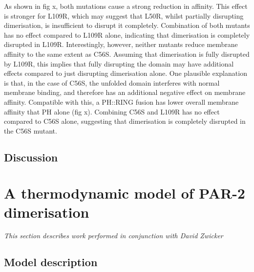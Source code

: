 \documentclass[12pt]{"article"}
\begin{document}
As shown in fig x, both mutations cause a strong reduction in affinity. This effect is stronger for L109R, which may suggest that L50R, whilst partially disrupting dimerisation, is insufficient to disrupt it completely. Combination of both mutants has no effect compared to L109R alone, indicating that dimerisation is completely disrupted in L109R. Interestingly, however, neither mutants reduce membrane affinity to the same extent as C56S. Assuming that dimerisation is fully disrupted by L109R, this implies that fully disrupting the domain may have additional effects compared to just disrupting dimerisation alone. One plausible explanation is that, in the case of C56S, the unfolded domain interferes with normal membrane binding, and therefore has an additional negative effect on membrane affinity. Compatible with this, a PH::RING fusion has lower overall membrane affinity that PH alone (fig x). Combining C56S and L109R has no effect compared to C56S alone, suggesting that dimerisation is completely disrupted in the C56S mutant.\\

\clearpage
\subsection{Discussion}


\clearpage
\section{A thermodynamic model of PAR-2 dimerisation}

\textit{This section describes work performed in conjunction with David Zwicker}

\subsection{Model description}


\end{document}
